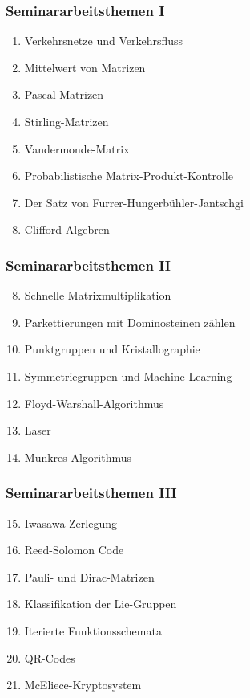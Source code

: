 %
%
%
\begin{frame}
\frametitle{Seminararbeitsthemen I}
\begin{enumerate}[<+->]
\item
Verkehrsnetze und Verkehrsfluss
\item
Mittelwert von Matrizen
\item
Pascal-Matrizen
\item 
Stirling-Matrizen
\item
Vandermonde-Matrix
\item
Probabilistische Matrix-Produkt-Kontrolle
\item
Der Satz von Furrer-Hungerbühler-Jantschgi
\item
Clifford-Algebren
\end{enumerate}
\end{frame}

\begin{frame}
\frametitle{Seminararbeitsthemen II}
\begin{enumerate}[<+->]
\setcounter{enumi}{7}
\item
Schnelle Matrixmultiplikation
\item
Parkettierungen mit Dominosteinen zählen
\item
Punktgruppen und Kristallographie
\item
Symmetriegruppen und Machine Learning
\item
Floyd-Warshall-Algorithmus
\item
Laser
\item
Munkres-Algorithmus
\end{enumerate}
\end{frame}

\begin{frame}
\frametitle{Seminararbeitsthemen III}
\begin{enumerate}[<+->]
\setcounter{enumi}{14}
\item
Iwasawa-Zerlegung
\item 
Reed-Solomon Code
\item
Pauli- und Dirac-Matrizen
\item
Klassifikation der Lie-Gruppen
\item
Iterierte Funktionsschemata
\item
QR-Codes
\item
McEliece-Kryptosystem
\end{enumerate}
\end{frame}
